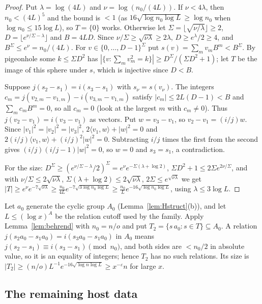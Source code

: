 \documentclass[11pt]{amsart}
\newcommand{\eps}{\varepsilon}
\theoremstyle{plain}
\theoremstyle{definition}
\numberwithin{equation}{section}
\begin{document}
\begin{proof}
Put $\lambda=\log(4L)$ and $\nu=\log(n_0/(4L))$. If $\nu<4\lambda$, then $n_0<(4L)^5$ and the bound is
$<1$ (as $16\sqrt{\log n_0\log L}\ge\log n_0$ when $\log n_0\le15\log L$), so $T=\{0\}$ works.
Otherwise let $\Sigma=\lfloor\sqrt{\nu/\lambda}\rfloor\ge2$, $D=\lfloor e^{\nu/\Sigma-\lambda}\rfloor$ and
$B=4LD$. Since $\nu/\Sigma\ge\sqrt{\nu\lambda}\ge2\lambda$, $D\ge e^{\lambda}/2\ge4$, and
$B^\Sigma\le e^\nu=n_0/(4L)$. For $v\in\{0,\dots,D-1\}^\Sigma$ put $s(v)=\sum_mv_mB^m<B^\Sigma$.
By pigeonhole some $k\le\Sigma D^2$ has $|\{v:\sum_mv_m^2=k\}|\ge D^\Sigma/(\Sigma D^2+1)$; let $T$ be
the image of this sphere under $s$, which is injective since $D<B$.

Suppose $j(s_2-s_1)=i(s_3-s_1)$ with $s_\nu=s(v_\nu)$. The integers
$c_m=j(v_{2,m}-v_{1,m})-i(v_{3,m}-v_{1,m})$ satisfy $|c_m|\le2L(D-1)<B$ and $\sum_mc_mB^m=0$, so all
$c_m=0$ (look at the largest $m$ with $c_m\ne0$). Thus $j(v_2-v_1)=i(v_3-v_1)$ as vectors. Put
$w=v_3-v_1$, so $v_2-v_1=(i/j)w$. Since $|v_1|^2=|v_2|^2=|v_3|^2$,
$2\langle v_1,w\rangle+|w|^2=0$ and $2(i/j)\langle v_1,w\rangle+(i/j)^2|w|^2=0$. Subtracting $i/j$
times the first from the second gives $(i/j)(i/j-1)|w|^2=0$, so $w=0$ and $s_3=s_1$, a
contradiction.

For the size: $D^\Sigma\ge(e^{\nu/\Sigma-\lambda}/2)^\Sigma=e^\nu e^{-\Sigma(\lambda+\log2)}$,
$\Sigma D^2+1\le2\Sigma e^{2\nu/\Sigma}$, and with $\nu/\Sigma\le2\sqrt{\nu\lambda}$,
$\Sigma(\lambda+\log2)\le2\sqrt{\nu\lambda}$, $2\Sigma\le e^{\sqrt{\nu\lambda}}$ we get
$|T|\ge e^\nu e^{-7\sqrt{\nu\lambda}}\ge\frac{n_0}{4L}e^{-7\sqrt{3\log n_0\log L}}\ge\frac{n_0}{L}e^{-16\sqrt{\log n_0\log L}}$,
using $\lambda\le3\log L$.
\end{proof}

Let $a_0$ generate the cyclic group $A_0$ (Lemma~\ref{lem:Hstruct}(b)), and let $L\le(\log x)^A$ be
the relation cutoff used by the family. Apply Lemma~\ref{lem:behrend} with $n_0=n/o$ and put
$T_2=\{s\,a_0:s\in T\}\subseteq A_0$. A relation $j(s_2a_0-s_1a_0)=i(s_3a_0-s_1a_0)$ in $A_0$ means
$j(s_2-s_1)\equiv i(s_3-s_1)\pmod{n_0}$, and both sides are $<n_0/2$ in absolute value, so it is an
equality of integers; hence $T_2$ has no such relations. Its size is
$|T_2|\ge(n/o)L^{-1}e^{-16\sqrt{\log n\log L}}\ge x^{-\eps}n$ for large $x$.

\subsection{The remaining host data}
\end{document}
